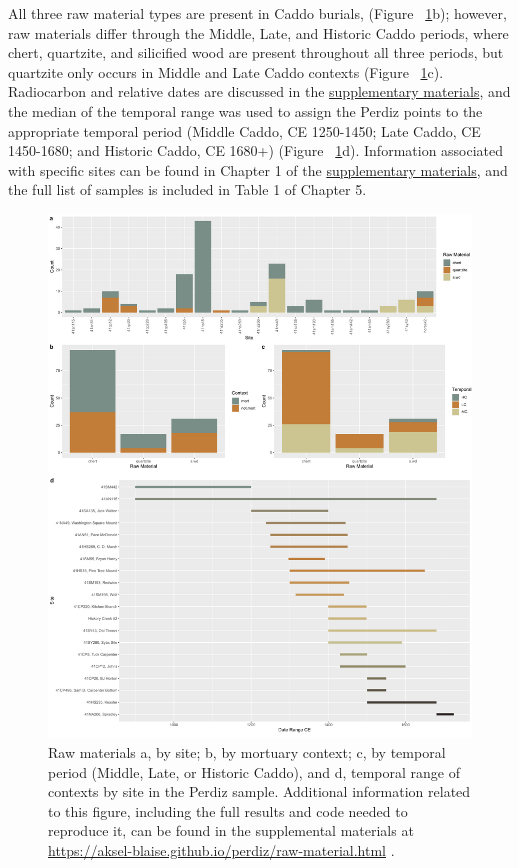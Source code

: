 \documentclass[review]{elsarticle}
\begin{document}
All three raw material types are present in Caddo burials, (Figure ~\ref{fig:raw.mat}b); however, raw materials differ through the Middle, Late, and Historic Caddo periods, where chert, quartzite, and silicified wood are present throughout all three periods, but quartzite only occurs in Middle and Late Caddo contexts (Figure ~\ref{fig:raw.mat}c). Radiocarbon and relative dates are discussed in the \href{https://aksel-blaise.github.io/perdiz/perdiz-arrow-point-sample.html}{supplementary materials}, and the median of the temporal range was used to assign the Perdiz points to the appropriate temporal period (Middle Caddo, CE 1250-1450; Late Caddo, CE 1450-1680; and Historic Caddo, CE 1680+) (Figure ~\ref{fig:raw.mat}d). Information associated with specific sites can be found in Chapter 1 of the \href{https://aksel-blaise.github.io/perdiz/perdiz-arrow-point-sample.html}{supplementary materials}, and the full list of samples is included in Table 1 of Chapter 5.

\begin{figure}[!h]\centering
\includegraphics[width=\linewidth]{fig.mat.temp.pdf}
\caption{Raw materials a, by site; b, by mortuary context; c, by temporal period (Middle, Late, or Historic Caddo), and d, temporal range of contexts by site in the Perdiz sample. Additional information related to this figure, including the full results and code needed to reproduce it, can be found in the supplemental materials at \href{https://aksel-blaise.github.io/perdiz/raw-material.html}{https://aksel-blaise.github.io/perdiz/raw-material.html} \citep{RN8980}.}
\label{fig:raw.mat}
\end{figure}
\end{document}
